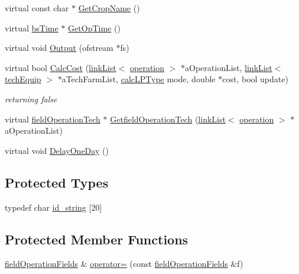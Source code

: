 \begin{DoxyCompactItemize}
\item 
virtual const char $\ast$ \hyperlink{classfield_operation_fields_a97cc7b523640a81790e9d147331c67da}{GetCropName} ()
\item 
virtual \hyperlink{classbs_time}{bsTime} $\ast$ \hyperlink{classfield_operation_fields_a31ce7910466fadb0a560eb7e56b001e8}{GetOpTime} ()
\item 
virtual void \hyperlink{classfield_operation_fields_a8dff595b832bca540dda946639f7f47a}{Output} (ofstream $\ast$fs)
\item 
virtual bool \hyperlink{classfield_operation_fields_aeb2bce9d4612033dbab366d870e432a6}{CalcCost} (\hyperlink{classlink_list}{linkList}$<$ \hyperlink{classoperation}{operation} $>$ $\ast$aOperationList, \hyperlink{classlink_list}{linkList}$<$ \hyperlink{classtech_equip}{techEquip} $>$ $\ast$aTechFarmList, \hyperlink{typer_8h_af05cf854fc14086a0d6404be5ae9813f}{calcLPType} mode, double $\ast$cost, bool update)
\begin{DoxyCompactList}\small\item\em returning false \item\end{DoxyCompactList}\item 
virtual \hyperlink{classfield_operation_tech}{fieldOperationTech} $\ast$ \hyperlink{classfield_operation_fields_a0b7b1a0da8d7bbc651bf9256fc3eef9f}{GetfieldOperationTech} (\hyperlink{classlink_list}{linkList}$<$ \hyperlink{classoperation}{operation} $>$ $\ast$aOperationList)
\item 
virtual void \hyperlink{classfield_operation_fields_a29c2d6912bf930809a3922350b8adad6}{DelayOneDay} ()
\end{DoxyCompactItemize}
\subsection*{Protected Types}
\begin{DoxyCompactItemize}
\item 
typedef char \hyperlink{classfield_operation_fields_a65517d20c09329343461131d07d48ecb}{id\_\-string} \mbox{[}20\mbox{]}
\end{DoxyCompactItemize}
\subsection*{Protected Member Functions}
\begin{DoxyCompactItemize}
\item 
\hyperlink{classfield_operation_fields}{fieldOperationFields} \& \hyperlink{classfield_operation_fields_aef84e67b95aeff732e28cbd2b197648a}{operator=} (const \hyperlink{classfield_operation_fields}{fieldOperationFields} \&f)
\end{DoxyCompactItemize}
